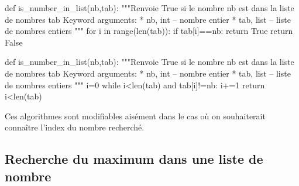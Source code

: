 \documentclass[10pt]{article}
\begin{document}
\begin{minipage}[c]{.49\linewidth}
\begin{py}
\begin{python}
def is_number_in_list(nb,tab):
    """Renvoie True si le nombre nb est dans la liste 
    de nombres tab
    Keyword arguments:
      * nb, int -- nombre entier
      * tab, list -- liste de nombres entiers    
    """
    for i in range(len(tab)):
        if tab[i]==nb:
            return True
    return False
\end{python}
\end{py}
\end{minipage}\hfill
\begin{minipage}[c]{.49\linewidth}
\begin{py}
\begin{python}
def is_number_in_list(nb,tab):
    """Renvoie True si le nombre nb est dans la liste 
    de nombres tab
    Keyword arguments:
      * nb, int -- nombre entier
      * tab, list -- liste de nombres entiers    
    """
    i=0
    while i<len(tab) and tab[i]!=nb:
        i+=1
    return i<len(tab)
\end{python}
\end{py}
\end{minipage}

\begin{rem}
Ces algorithmes sont modifiables aisément dans le cas où on souhaiterait connaître l'index du nombre recherché.
\end{rem}




\subsection{Recherche du maximum dans une liste de nombre}
\end{document}

